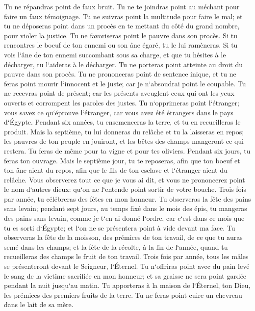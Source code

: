 \verse Tu ne répandras point de faux bruit. Tu ne te joindras point au méchant pour faire un faux témoignage. 
\verse Tu ne suivras point la multitude pour faire le mal; et tu ne déposeras point dans un procès en te mettant du côté du grand nombre, pour violer la justice. 
\verse Tu ne favoriseras point le pauvre dans son procès. 
\verse Si tu rencontres le boeuf de ton ennemi ou son âne égaré, tu le lui ramèneras. 
\verse Si tu vois l`âne de ton ennemi succombant sous sa charge, et que tu hésites à le décharger, tu l`aideras à le décharger. 
\verse Tu ne porteras point atteinte au droit du pauvre dans son procès. 
\verse Tu ne prononceras point de sentence inique, et tu ne feras point mourir l`innocent et le juste; car je n`absoudrai point le coupable. 
\verse Tu ne recevras point de présent; car les présents aveuglent ceux qui ont les yeux ouverts et corrompent les paroles des justes. 
\verse Tu n`opprimeras point l`étranger; vous savez ce qu`éprouve l`étranger, car vous avez été étrangers dans le pays d`Égypte. 
\verse Pendant six années, tu ensemenceras la terre, et tu en recueilleras le produit. 
\verse Mais la septième, tu lui donneras du relâche et tu la laisseras en repos; les pauvres de ton peuple en jouiront, et les bêtes des champs mangeront ce qui restera. Tu feras de même pour ta vigne et pour tes oliviers. 
\verse Pendant six jours, tu feras ton ouvrage. Mais le septième jour, tu te reposeras, afin que ton boeuf et ton âne aient du repos, afin que le fils de ton esclave et l`étranger aient du relâche. 
\verse Vous observerez tout ce que je vous ai dit, et vous ne prononcerez point le nom d`autres dieux: qu`on ne l`entende point sortir de votre bouche. 
\verse Trois fois par année, tu célébreras des fêtes en mon honneur. 
\verse Tu observeras la fête des pains sans levain; pendant sept jours, au temps fixé dans le mois des épis, tu mangeras des pains sans levain, comme je t`en ai donné l`ordre, car c`est dans ce mois que tu es sorti d`Égypte; et l`on ne se présentera point à vide devant ma face. 
\verse Tu observeras la fête de la moisson, des prémices de ton travail, de ce que tu auras semé dans les champs; et la fête de la récolte, à la fin de l`année, quand tu recueilleras des champs le fruit de ton travail. 
\verse Trois fois par année, tous les mâles se présenteront devant le Seigneur, l`Éternel. 
\verse Tu n`offriras point avec du pain levé le sang de la victime sacrifiée en mon honneur; et sa graisse ne sera point gardée pendant la nuit jusqu`au matin. 
\verse Tu apporteras à la maison de l`Éternel, ton Dieu, les prémices des premiers fruits de la terre. Tu ne feras point cuire un chevreau dans le lait de sa mère. 
